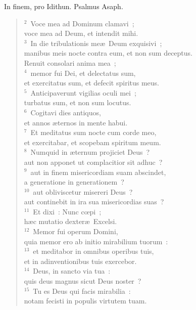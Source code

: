 \lettrine[lines=3,image=true,loversize=0.05,lraise=-0.03]{I}{}n finem, pro Idithun. Psalmus Asaph.
\begin{flushleft}\begin{verse}\vspace{6pt}${}^{2}$~Voce mea ad Dominum clamavi~;\\ voce mea ad Deum, et intendit mihi.\\
${}^{3}$~In die tribulationis me\ae\ Deum exquisivi~;\\ manibus meis nocte contra eum, et non sum deceptus.\\ Renuit consolari anima mea~;\\
${}^{4}$~memor fui Dei, et delectatus sum,\\ et exercitatus sum, et defecit spiritus meus.\\
${}^{5}$~Anticipaverunt vigilias oculi mei~;\\ turbatus sum, et non sum locutus.\\
${}^{6}$~Cogitavi dies antiquos,\\ et annos \ae ternos in mente habui.\\
${}^{7}$~Et meditatus sum nocte cum corde meo,\\ et exercitabar, et scopebam spiritum meum.\\
${}^{8}$~Numquid in \ae ternum projiciet Deus~?\\ aut non apponet ut complacitior sit adhuc~?\\
${}^{9}$~aut in finem misericordiam suam abscindet,\\ a generatione in generationem~?\\
${}^{10}$~aut obliviscetur misereri Deus~?\\ aut continebit in ira sua misericordias suas~?\\
${}^{11}$~Et dixi~: Nunc cœpi~;\\ h\ae c mutatio dexter\ae\ Excelsi.\\
${}^{12}$~Memor fui operum Domini,\\ quia memor ero ab initio mirabilium tuorum~:\\
${}^{13}$~et meditabor in omnibus operibus tuis,\\ et in adinventionibus tuis exercebor.\\
${}^{14}$~Deus, in sancto via tua~:\\ quis deus magnus sicut Deus noster~?\\
${}^{15}$~Tu es Deus qui facis mirabilia~:\\ notam fecisti in populis virtutem tuam.\\

\end{verse}
\end{flushleft}
